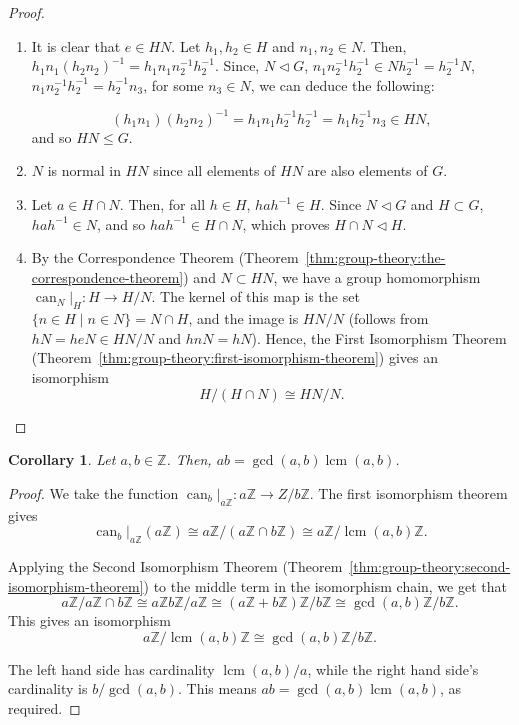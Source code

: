 \documentclass[12pt]{report}
\newcommand{\Z}{\mathbb{Z}}
\newcommand{\iso}{\cong}
\newcommand{\can}{\operatorname{can}}
\newtheorem{corollary}[theorem]{Corollary}
\theoremstyle{definition}
\newcommand{\lcm}{\operatorname{lcm}}
\begin{document}
\begin{proof}
  \begin{enumerate}
  \item
    It is clear that \(e \in HN\).
    Let \(h_{1}, h_{2} \in H\) and \(n_{1}, n_{2} \in N\).
    Then, \(h_{1}n_{1}(h_{2}n_{2})^{-1} = h_{1}n_{1}n_{2}^{-1}h_{2}^{-1}\).
    Since, \(N \triangleleft G\), \(n_{1}n_{2}^{-1}h_{2}^{-1} \in Nh_{2}^{-1} = h_{2}^{-1}N\), \(n_{1}n_{2}^{-1}h_{2}^{-1} = h_{2}^{-1}n_{3}\), for some \(n_{3} \in N\), we can deduce the following:

    \[(h_{1}n_{1})(h_{2}n_{2})^{-1} = h_{1}n_{1}h_{2}^{-1}h_{2}^{-1} = h_{1}h_{2}^{-1}n_{3} \in HN,\]
    and so \(HN \leq G\).

    \item
      \(N\) is normal in \(HN\) since all elements of \(HN\) are also elements of \(G\).

    \item
      Let \(a \in H \cap N\).
      Then, for all \(h \in H\), \(hah^{-1} \in H\).
      Since \(N \triangleleft G\) and \(H \subset G\), \(hah^{-1} \in N\), and so \(hah^{-1} \in H \cap N\), which proves \(H\cap N \triangleleft H\).
    \item
     By the Correspondence Theorem (Theorem~\ref{thm:group-theory:the-correspondence-theorem}) and \(N \subset HN\), we have a group homomorphism \(\can_{N}|_{H}: H \to H/N\).
     The kernel of this map is the set \(\{n \in H \mid n \in N\} = N \cap H\), and the image is \(HN/N\) (follows from \(hN = heN \in HN/N\) and \(hnN = hN\)).
     Hence, the First Isomorphism Theorem (Theorem~\ref{thm:group-theory:first-isomorphism-theorem}) gives an isomorphism
     \[H/(H\cap N) \iso HN/N.\]
  \end{enumerate}
\end{proof}

\begin{corollary}
  Let \(a,b \in \Z\).
  Then, \(ab = \gcd(a,b)\lcm(a,b)\).
\end{corollary}

\begin{proof}
  We take the function \(\can_{b}|_{a\Z} : a\Z \to Z / b\Z\).
  The first isomorphism theorem gives
  \[\can_{b}|_{a\Z}(a\Z) \iso a\Z / (a\Z \cap b\Z) \iso a\Z / \lcm(a,b)\Z.\]

  Applying the Second Isomorphism Theorem (Theorem~\ref{thm:group-theory:second-isomorphism-theorem}) to the middle term in the isomorphism chain, we get that
  \[a\Z / a\Z \cap b\Z \iso a\Z b\Z / a\Z \iso (a\Z + b\Z)\Z / b\Z \iso \gcd(a,b) \Z / b\Z.\]
  This gives an isomorphism
  \[a\Z/ \lcm(a,b)\Z \iso \gcd(a,b)\Z/ b\Z.\]

  The left hand side has cardinality \(\lcm(a,b)/a\), while the right hand side's cardinality is \(b/\gcd(a,b)\).
  This means \(ab = \gcd(a,b)\lcm(a,b)\), as required.
\end{proof}
\end{document}
